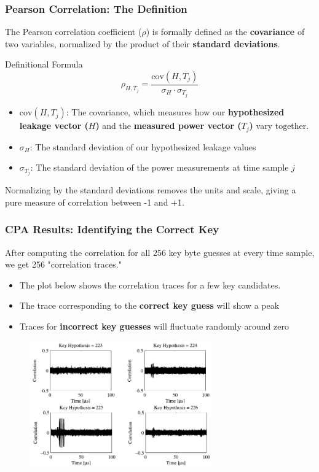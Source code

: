 \begin{frame}
    \frametitle{Pearson Correlation: The Definition}

    The Pearson correlation coefficient ($\rho$) is formally defined as the \textbf{covariance} of two variables, normalized by the product of their \textbf{standard deviations}.

    \begin{block}{Definitional Formula}
    \[
        \rho_{H, T_j} = \frac{\text{cov}(H, T_j)}{\sigma_H \cdot \sigma_{T_j}}
    \]
    \end{block}
    
    \begin{itemize}
        \item $\text{cov}(H, T_j)$: The covariance, which measures how our \textbf{hypothesized leakage vector ($H$)} and the \textbf{measured power vector ($T_j$)} vary together.
        \item $\sigma_H$: The standard deviation of our hypothesized leakage values
        \item $\sigma_{T_j}$: The standard deviation of the power measurements at time sample $j$ 
    \end{itemize}
    Normalizing by the standard deviations removes the units and scale, giving a pure measure of correlation between -1 and +1.
\end{frame}


\begin{frame}
    \frametitle{CPA Results: Identifying the Correct Key}

    After computing the correlation for all 256 key byte guesses at every time sample, we get 256 "correlation traces."

    \begin{itemize}
        \item The plot below shows the correlation traces for a few key candidates.
        \item The trace corresponding to the \textbf{correct key guess} will show a peak
        \item Traces for \textbf{incorrect key guesses} will fluctuate randomly around zero
    \end{itemize}

    \begin{figure}
        \centering
        \includegraphics[width=0.7\textwidth]{main thing/Pictures/CPA_correlation_traces.png} 
        
    \end{figure}
\end{frame}

